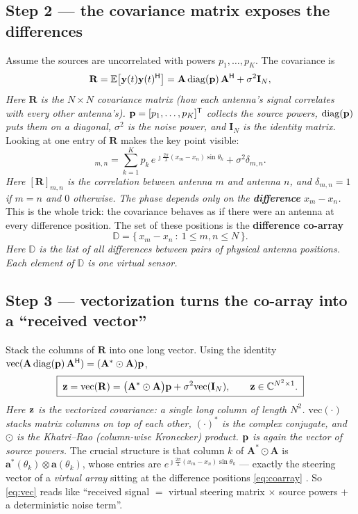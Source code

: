 \documentclass[11pt]{article}
\newcommand{\herm}{^{\mathsf{H}}}
\newcommand{\T}{^{\mathsf{T}}}
\newcommand{\va}{\mathbf{a}}\newcommand{\vy}{\mathbf{y}}\newcommand{\vs}{\mathbf{s}}
\newcommand{\mA}{\mathbf{A}}\newcommand{\mR}{\mathbf{R}}\newcommand{\mI}{\mathbf{I}}
\newcommand{\E}{\mathbb{E}}\newcommand{\C}{\mathbb{C}}
\newcommand{\kr}{\odot}
\begin{document}
\subsection{Step 2 --- the covariance matrix exposes the differences}
Assume the sources are uncorrelated with powers $p_{1},\dots,p_{K}$. The covariance is
\begin{equation}
\mR=\E\big[\vy(t)\vy(t)\herm\big]=\mA\,\mathrm{diag}(\vp)\,\mA\herm+\sigma^{2}\mI_{N},
\label{eq:cov}
\end{equation}
\textit{Here $\mR$ is the $N\times N$ covariance matrix (how each antenna's signal correlates with
every other antenna's). $\vp=[p_{1},\dots,p_{K}]\T$ collects the source powers,
$\mathrm{diag}(\mathbf{p})$ puts them on a diagonal, $\sigma^{2}$ is the noise power, and $\mI_{N}$ is the
identity matrix.} Looking at one entry of $\mR$ makes the key point visible:
\begin{equation}
[\mR]_{m,n}=\sum_{k=1}^{K}p_{k}\,e^{\,\jmath\frac{2\pi}{\lambda}(x_{m}-x_{n})\sin\theta_{k}}
+\sigma^{2}\delta_{m,n}.
\label{eq:entry}
\end{equation}
\textit{Here $[\mR]_{m,n}$ is the correlation between antenna $m$ and antenna $n$, and
$\delta_{m,n}=1$ if $m=n$ and $0$ otherwise. The phase depends only on the \textbf{difference}
$x_{m}-x_{n}$.} This is the whole trick: the covariance behaves as if there were an antenna at every
difference position. The set of these positions is the \textbf{difference co-array}
\begin{equation}
\mathbb{D}=\{\,x_{m}-x_{n}\ :\ 1\le m,n\le N\,\}.
\label{eq:coarray}
\end{equation}
\textit{Here $\mathbb{D}$ is the list of all differences between pairs of physical antenna positions.
Each element of $\mathbb{D}$ is one \emph{virtual sensor}.}

\subsection{Step 3 --- vectorization turns the co-array into a ``received vector''}
Stack the columns of $\mR$ into one long vector. Using the identity
$\mathrm{vec}(\mA\,\mathrm{diag}(\vp)\,\mA\herm)=(\mA^{*}\kr\mA)\vp$,
\begin{equation}
\boxed{\;\vz=\mathrm{vec}(\mR)=\big(\mA^{*}\kr\mA\big)\vp+\sigma^{2}\mathrm{vec}(\mI_{N}),
\qquad \vz\in\C^{N^{2}\times1}.\;}
\label{eq:vec}
\end{equation}
\textit{Here $\mathbf{z}$ is the vectorized covariance: a single long column of length $N^{2}$.
$\mathrm{vec}(\cdot)$ stacks matrix columns on top of each other, $(\cdot)^{*}$ is the complex
conjugate, and $\kr$ is the Khatri--Rao (column-wise Kronecker) product. $\mathbf{p}$ is again the vector of
source powers.} The crucial structure is that column $k$ of $\mA^{*}\kr\mA$ is
$\va^{*}(\theta_{k})\otimes\va(\theta_{k})$, whose entries are
$e^{\jmath\frac{2\pi}{\lambda}(x_{m}-x_{n})\sin\theta_{k}}$ --- exactly the steering vector of a
\emph{virtual array} sitting at the difference positions \eqref{eq:coarray}
\cite{pal2010nested}. So \eqref{eq:vec} reads like ``received signal $=$ virtual steering matrix
$\times$ source powers $+$ a deterministic noise term''.
\end{document}
